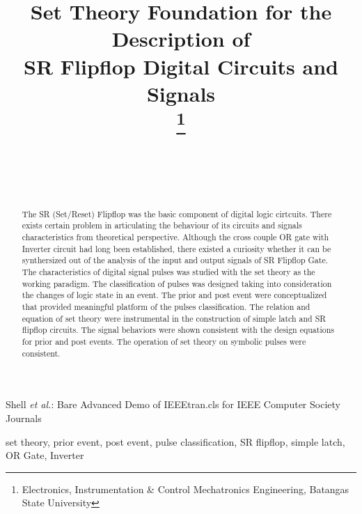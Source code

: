 \documentclass[10pt,journal]{IEEEtran}
\begin{document}
 
\title{\textrm {Set Theory Foundation for the Description of \\ SR Flipflop        Digital Circuits and Signals}\\  
\thanks{\IEEEcompsocthanksitem Electronics, Instrumentation \& Control Mechatronics Engineering,              \newline Batangas State University
}} 
\author{ \\ 
 \\ \ \\ 
 }
\maketitle  
{}%
    {Shell \MakeLowercase{\textit{et al.}}: Bare Advanced Demo of     IEEEtran.cls for IEEE Computer Society Journals}
\begin{abstract}The SR (Set/Reset) Flipflop was the basic component of digital logic cirtcuits. There exists certain problem in articulating the behaviour of its circuits and signals characteristics from theoretical perspective. Although the cross couple OR gate with Inverter circuit had long been established, there existed a curiosity whether it can be synthersized out of the analysis of the input and output signals of SR Flipflop Gate. The characteristics of digital signal pulses was studied with the set theory as the working paradigm. The classification of pulses was designed taking into consideration the changes of logic state in an event. The prior and post event were conceptualized that provided meaningful platform of the pulses classification. The relation and equation of set theory were instrumental in the construction of simple latch and SR flipflop circuits. The signal behaviors were shown consistent with the design equations for  prior and post events. The operation of set theory on symbolic pulses were consistent.\end{abstract}
\begin{IEEEkeywords}set theory, prior event, post event, pulse classification, SR flipflop,     simple latch, OR Gate, Inverter \end{IEEEkeywords}
\end{document}
